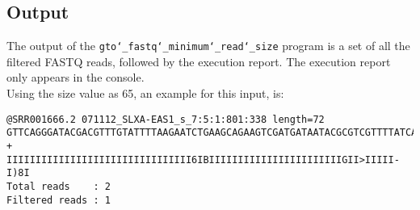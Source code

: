 \subsection*{Output}
The output of the \texttt{gto\char`_fastq\char`_minimum\char`_read\char`_size} program is a set of all the filtered FASTQ reads, followed by the execution report.
The execution report only appears in the console.\\
Using the size value as 65, an example for this input, is:
\begin{lstlisting}
@SRR001666.2 071112_SLXA-EAS1_s_7:5:1:801:338 length=72
GTTCAGGGATACGACGTTTGTATTTTAAGAATCTGAAGCAGAAGTCGATGATAATACGCGTCGTTTTATCAT
+
IIIIIIIIIIIIIIIIIIIIIIIIIIIIIIII6IBIIIIIIIIIIIIIIIIIIIIIIIGII>IIIII-I)8I
Total reads    : 2
Filtered reads : 1
\end{lstlisting}
